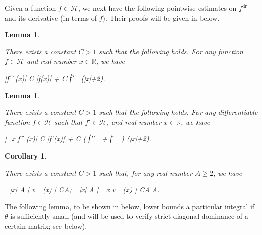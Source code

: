 \documentclass{amsart}
\numberwithin{equation}{section}
\DeclareMathOperator{\dr}{dr}
\DeclareMathOperator{\eff}{eff}
\newtheorem{lem}[thm]{Lemma}
\newtheorem{cor}[thm]{Corollary}
\theoremstyle{remark}
\theoremstyle{definition}
\begin{document}
	
	
	Given a function $f \in \mathcal{H}$, we next have the following pointwise estimates on $f^{\dr}$ and its derivative (in terms of $f$). Their proofs will be given in  below.
	
	\begin{lem} 
		\label{xf2} 
		
		There exists a constant $C>1$ such that the following holds. For any function $f \in \mathcal{H}$ and real number $x \in \mathbb{R}$, we have 
		\begin{flalign*} 
			|f^{\dr} (x)| \le C \cdot |f(x)| + C \| f \|_{} \cdot \log (|x|+2).
		\end{flalign*} 
		
	\end{lem} 
	
	
	\begin{lem} 
		\label{derivativefg}
		
		There exists a constant $C>1$ such that the following holds. For any differentiable function $f \in \mathcal{H}$ such that $f' \in \mathcal{H}$, and real number $x \in \mathbb{R}$, we have 
		\begin{flalign*}
			|\partial_x f^{\dr} (x)| \le C \cdot |f'(x)| + C (  \| f' \|_{} + \| f \|_{} ) \cdot \log (|x|+2).
		\end{flalign*} 
	\end{lem} 
	
	\begin{cor}
		\label{derivativev}
		
		There exists a constant $C>1$ such that, for any real number $A \ge 2$, we have
		\begin{flalign*}
			\displaystyle\sup_{|x| \le A} | v_{\eff} (x) | \le CA; \qquad \displaystyle\sup_{|x| \le A} | \partial_x v_{\eff} (x) | \le CA \log A. 
		\end{flalign*}
		
	\end{cor} 
	
	The following lemma, to be shown in  below, lower bounds a particular integral if $\theta$ is sufficiently small (and will be used to verify strict diagonal dominance of a certain matrix; see  below).
	
\end{document}
